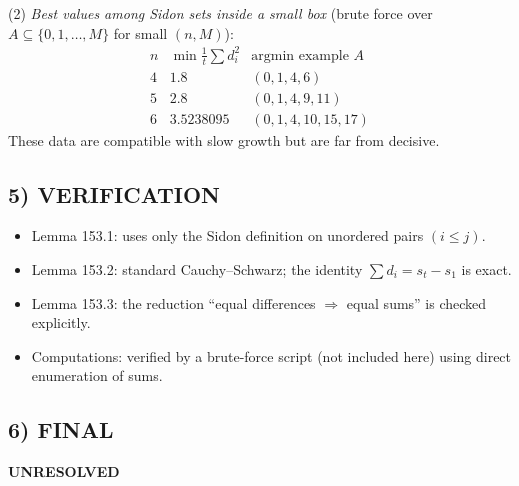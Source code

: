 (2) \emph{Best values among Sidon sets inside a small box} (brute force over $A\subseteq\{0,1,\dots,M\}$ for small $(n,M)$):
\[
\begin{array}{c|c|l}
 n & \min \frac{1}{t}\sum d_i^2 & \text{argmin example }A \\\hline
 4 & 1.8 & (0,1,4,6)\\
 5 & 2.8 & (0,1,4,9,11)\\
 6 & 3.5238095 & (0,1,4,10,15,17)
\end{array}
\]
These data are compatible with slow growth but are far from decisive.

\subsection*{5) VERIFICATION}
\begin{itemize}
\item Lemma 153.1: uses only the Sidon definition on unordered pairs $(i\le j)$.
\item Lemma 153.2: standard Cauchy--Schwarz; the identity $\sum d_i=s_t-s_1$ is exact.
\item Lemma 153.3: the reduction ``equal differences $\Rightarrow$ equal sums'' is checked explicitly.
\item Computations: verified by a brute-force script (not included here) using direct enumeration of sums.
\end{itemize}

\subsection*{6) FINAL}
\textbf{UNRESOLVED}

